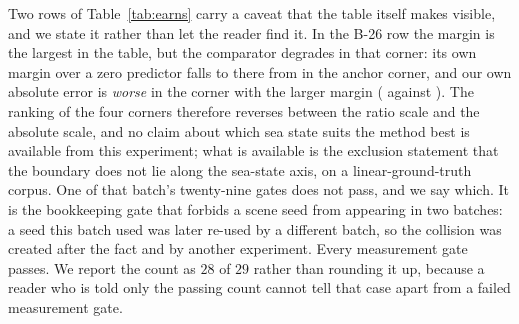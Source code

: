 \documentclass[review]{elsarticle}
\begin{document}
Two rows of Table~\ref{tab:earns} carry a caveat that the table itself makes
visible, and we state it rather than let the reader find it. In the B-26 row the
margin is the largest in the table, but the comparator degrades in that corner:
its own margin over a zero predictor falls to \BTwentySixCmpRel{} there from
\BTwentySixAnchorCmpRel{} in the anchor corner, and our own absolute error is
\emph{worse} in the corner with the larger margin (\BTwentySixAbs{} against
\BTwentySixAnchorAbs{}). The ranking of the four corners therefore reverses
between the ratio scale and the absolute scale, and no claim about which sea state
suits the method best is available from this experiment; what is available is the
exclusion statement that the boundary does not lie along the sea-state axis, on a
linear-ground-truth corpus.
One of that batch's twenty-nine gates does not pass, and we say which. It is the
bookkeeping gate that forbids a scene seed from appearing in two batches: a seed
this batch used was later re-used by a different batch, so the collision was created
after the fact and by another experiment. Every measurement gate passes. We report
the count as $28$ of $29$ rather than rounding it up, because a
reader who is told only the passing count cannot tell that case apart from a failed
measurement gate.
\end{document}
